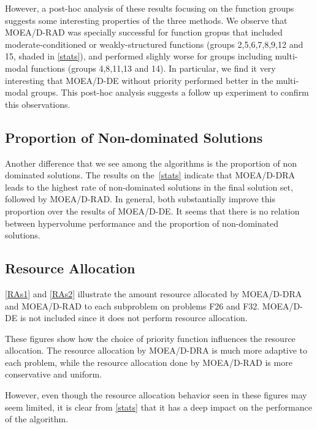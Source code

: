 However, a post-hoc analysis of these results focusing on the function groups
suggests some interesting properties of the three methods. We observe that
MOEA/D-RAD was specially successful for function gropus that included
moderate-conditioned or weakly-structured functions (groups 2,5,6,7,8,9,12 and
15, shaded in \ref{stats}), and performed slighly worse for groups including
multi-modal functions (groups 4,8,11,13 and 14). In particular, we find it  very
interesting that MOEA/D-DE without priority performed better in the multi-modal
groups. This post-hoc analysis suggests a follow up experiment to confirm this
observations.

\subsection{Proportion of Non-dominated Solutions}

Another difference that we see among the algorithms  is the proportion of non
dominated solutions. The results on the~\ref{stats} indicate that MOEA/D-DRA
leads to the highest rate of non-dominated solutions in the final solution set,
followed by MOEA/D-RAD. In general, both substantially improve this proportion
over the results of MOEA/D-DE.  It seems that there is no relation between
hypervolume performance and the proportion of non-dominated solutions.


\subsection{Resource Allocation}


\ref{RAs1} and \ref{RAs2} illustrate the amount resource allocated by MOEA/D-DRA
and MOEA/D-RAD to each subproblem on problems F26 and F32. MOEA/D-DE is
not included since it does not perform resource allocation.

These figures show how the choice of priority function influences the
resource allocation. The resource allocation by MOEA/D-DRA is much more
adaptive to each problem, while the resource allocation done by
MOEA/D-RAD is more conservative and uniform.

However, even though the resource allocation behavior seen in these figures
may seem limited, it is clear from \ref{stats} that it has a deep impact on
the performance of the algorithm.
